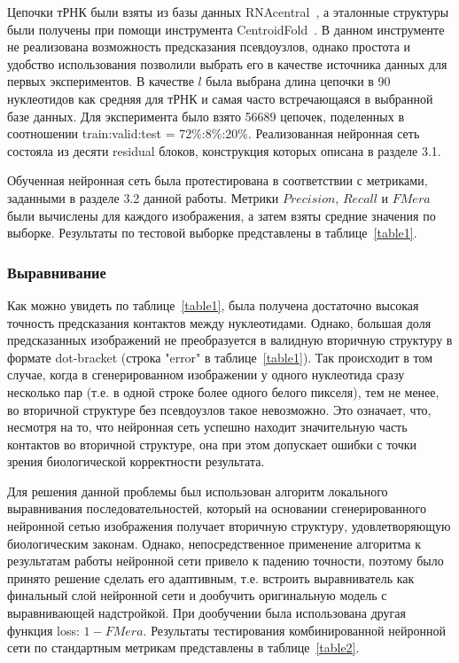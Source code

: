 \documentclass[14pt]{matmex-diploma-custom}
\begin{document}
Цепочки тРНК были взяты из базы данных RNAcentral~\cite{rnacentral}, а эталонные структуры были получены при помощи инструмента \linebreak CentroidFold~\cite{sato2009centroidfold}. В данном инструменте не реализована возможность предсказания псевдоузлов, однако простота и удобство использования позволили выбрать его в качестве источника данных для первых экспериментов. В качестве $l$ была выбрана длина цепочки в 90 нуклеотидов как средняя для тРНК и самая часто встречающаяся в выбранной базе данных. Для эксперимента было взято 56689 цепочек, поделенных в соотношении train:valid:test = 72\%:8\%:20\%. Реализованная нейронная сеть состояла из десяти residual блоков, конструкция которых описана в разделе 3.1.

Обученная нейронная сеть была протестирована в соответствии с метриками, заданными в разделе 3.2 данной работы. Метрики $Precision$, $Recall$ и $FMera$ были вычислены для каждого изображения, а затем взяты средние значения по выборке. Результаты по тестовой выборке представлены в таблице~\ref{table1}.



\subsubsection{Выравнивание}
Как можно увидеть по таблице~\ref{table1}, была получена достаточно высокая точность предсказания контактов между нуклеотидами. Однако, большая доля предсказанных изображений не преобразуется в валидную вторичную структуру в формате dot-bracket (строка "error" в таблице~\ref{table1}). Так происходит в том случае, когда в сгенерированном изображении у одного нуклеотида сразу несколько пар (т.е. в одной строке более одного белого пикселя), тем не менее, во вторичной структуре без псевдоузлов такое невозможно. Это означает, что, несмотря на то, что нейронная сеть успешно находит значительную часть контактов во вторичной структуре, она при этом допускает ошибки с точки зрения биологической корректности результата. 

Для решения данной проблемы был использован алгоритм локального выравнивания последовательностей, который на основании сгенерированного нейронной сетью изображения получает вторичную структуру, удовлетворяющую биологическим законам. Однако, непосредственное применение алгоритма к результатам работы нейронной сети привело к падению точности, поэтому было принято решение сделать его адаптивным, т.е. встроить выравниватель как финальный слой нейронной сети и дообучить оригинальную модель с выравнивающей надстройкой. При дообучении была использована другая функция loss: $1 - FMera$. Результаты тестирования комбинированной нейронной сети по стандартным метрикам представлены в таблице~\ref{table2}. 
\end{document}
